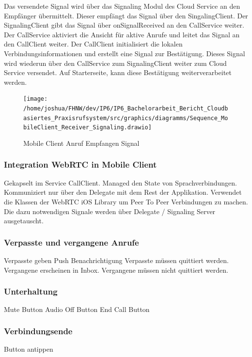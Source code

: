 Das versendete Signal wird über das Signaling Modul des Cloud Service an den Empfänger übermittelt.
Dieser empfängt das Signal über den SingalingClient.
Der SignalingClient gibt das Signal über onSignalReceived an den CallService weiter.
Der CallService aktiviert die Ansicht für aktive Anrufe und leitet das Signal an den CallClient weiter.
Der CallClient initialisiert die lokalen Verbindungsinformationen und erstellt eine Signal zur Bestätigung.
Dieses Signal wird wiederun über den CallService zum SignalingClient weiter zum Cloud Service versendet.
Auf Starterseite, kann diese Bestätigung weiterverarbeitet werden.

\begin{figure}[h]
    \centering
    \begin{minipage}[b]{0.8\textwidth}
        \texttt{[image: /home/joshua/FHNW/dev/IP6/IP6\_Bachelorarbeit\_Bericht\_Cloudbasiertes\_Praxisrufsystem/src/graphics/diagramms/Sequence\_MobileClient\_Receiver\_Signaling.drawio]}
        \caption{Mobile Client Anruf Empfangen Signal}
    \end{minipage}
\end{figure}

\clearpage

\subsubsection{Integration WebRTC in Mobile Client}

Gekapselt im Service CallClient.
Managed den State von Sprachverbindungen.
Kommuniziert nur über den Delegate mit dem Rest der Applikation.
Verwendet die Klassen der WebRTC iOS Library um Peer To Peer Verbindungen zu machen.
Die dazu notwendigen Signale werden über Delegate / Signaling Server ausgetauscht.

\subsubsection{Verpasste und vergangene Anrufe}

Verpasste geben Push Benachrichtigung
Verpasste müssen quittiert werden.
Vergangene erscheinen in Inbox.
Vergangene müssen nicht quittiert werden.

\subsubsection{Unterhaltung}

Mute Button
Audio Off Button
End Call Button


\subsubsection{Verbindungsende}

Button antippen

\clearpage
